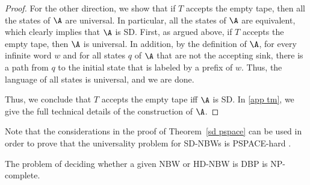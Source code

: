 \documentclass{lmcs}
\begin{document}
\begin{proof}
For the other direction, we show that if $T$ accepts the empty tape, then all the states of $\A$ are universal. In particular, all the states of $\A$ are equivalent, which clearly implies that $\A$ is SD. First, as argued above, if $T$ accepts the empty tape, then $\A$ is universal. In addition, by the definition of $\A$, for every infinite word $w$ and for all states $q$ of $\A$ that are not the accepting sink, there is a path from $q$ to the initial state that is labeled by a prefix of $w$. Thus, the language of all states is universal, and we are done.


Thus, we conclude that $T$ accepts the empty tape iff $\A$ is SD.
In \autoref{app tm}, we give the full technical details of the construction of $\A$.
\end{proof}

Note that the considerations in the proof of Theorem~\ref{sd pspace} can be used in order to prove that the universality problem for SD-NBWs is PSPACE-hard \cite{AK23}.


 \begin{thm}\label{NPC Buchi DBP}
	The problem of deciding whether a given NBW or HD-NBW is DBP is NP-complete.
\end{thm}
\end{document}
